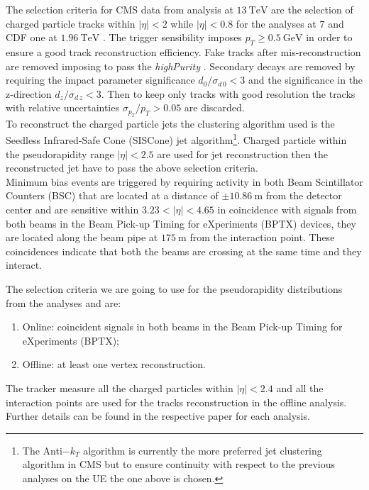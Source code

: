 The selection criteria for CMS data from analysis at $13\ \mathrm{TeV}$ \cite{CMS-PAS-FSQ-15-007} are the selection of charged particle tracks within $|\eta| < 2$ while  $|\eta|<0.8$ for the analyses at $7$ \cite{CMS-PAS-FSQ-12-020} and CDF one at $1.96\ \mathrm{TeV}$ \cite{CDF:2015txs}. The trigger sensibility imposes $p_T \geq 0.5\ \mathrm{GeV}$ in order to ensure a good track reconstruction efficiency. Fake tracks after mis-reconstruction are removed imposing to pass the \textit{highPurity} \cite{HighPurity}. Secondary decays are removed by requiring the impact parameter significance $d_0/\sigma_{d\,0} < 3$ and the significance in the z-direction $d_z/\sigma_{d\,z} < 3$. Then to keep only tracks with good resolution the tracks with relative uncertainties $\sigma_{p_T}/p_T > 0.05$ are discarded.
\\
To reconstruct the charged particle jets the clustering algorithm used is the Seedless Infrared-Safe Cone (SISCone) \cite{JetAlgorithm1} jet algorithm\footnote{The Anti$-k_T$ algorithm \cite{JetAlgorithm2} is currently the more preferred jet clustering algorithm in CMS but to ensure continuity with respect to the previous analyses on the UE the one above is chosen.}. Charged particle within the pseudorapidity range $|\eta|<2.5$ are used for jet reconstruction then the reconstructed jet have to pass the above selection criteria.
\\
Minimum bias events are triggered by requiring activity in both Beam Scintillator Counters (BSC) that are located at a distance of $\pm10.86\ \mathrm{m}$ from the detector center and are sensitive within $3.23 < |\eta| < 4.65$ in coincidence with signals from both beams in the Beam Pick-up Timing for eXperiments (BPTX) devices, they are located along the beam pipe at $175\ \mathrm{m}$ from the interaction point. These coincidences indicate that both the beams are crossing at the same time and they interact.

The selection criteria we are going to use for the pseudorapidity distributions from the analyses \cite{CMS:2018nhd} and \cite{CMS:2015zrm} are: 
\begin{enumerate}
	\item Online: coincident signals in both beams in the Beam Pick-up Timing for eXperiments (BPTX);
	\item Offline: at least one vertex reconstruction.
\end{enumerate}

The tracker measure all the charged particles within $|\eta|<2.4$ and all the interaction points are used for the tracks reconstruction in the offline analysis. 
\\
Further details can be found in the respective paper for each analysis.




